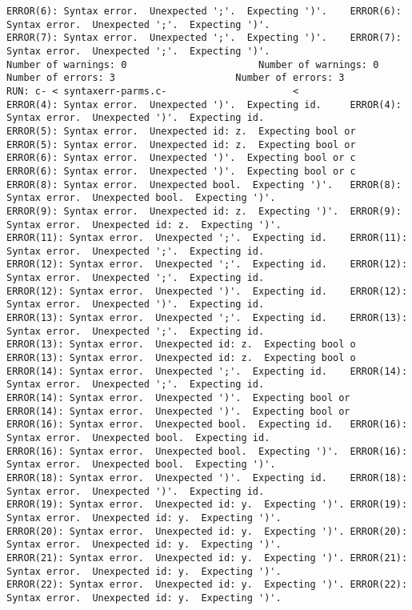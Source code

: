 \documentclass[12pt]{book}
\begin{document}
\begin{lstlisting}
ERROR(6): Syntax error.  Unexpected ';'.  Expecting ')'.	ERROR(6): Syntax error.  Unexpected ';'.  Expecting ')'.
ERROR(7): Syntax error.  Unexpected ';'.  Expecting ')'.	ERROR(7): Syntax error.  Unexpected ';'.  Expecting ')'.
Number of warnings: 0						Number of warnings: 0
Number of errors: 3						Number of errors: 3
RUN: c- < syntaxerr-parms.c-				      <
ERROR(4): Syntax error.  Unexpected ')'.  Expecting id.		ERROR(4): Syntax error.  Unexpected ')'.  Expecting id.
ERROR(5): Syntax error.  Unexpected id: z.  Expecting bool or	ERROR(5): Syntax error.  Unexpected id: z.  Expecting bool or
ERROR(6): Syntax error.  Unexpected ')'.  Expecting bool or c	ERROR(6): Syntax error.  Unexpected ')'.  Expecting bool or c
ERROR(8): Syntax error.  Unexpected bool.  Expecting ')'.	ERROR(8): Syntax error.  Unexpected bool.  Expecting ')'.
ERROR(9): Syntax error.  Unexpected id: z.  Expecting ')'.	ERROR(9): Syntax error.  Unexpected id: z.  Expecting ')'.
ERROR(11): Syntax error.  Unexpected ';'.  Expecting id.	ERROR(11): Syntax error.  Unexpected ';'.  Expecting id.
ERROR(12): Syntax error.  Unexpected ';'.  Expecting id.	ERROR(12): Syntax error.  Unexpected ';'.  Expecting id.
ERROR(12): Syntax error.  Unexpected ')'.  Expecting id.	ERROR(12): Syntax error.  Unexpected ')'.  Expecting id.
ERROR(13): Syntax error.  Unexpected ';'.  Expecting id.	ERROR(13): Syntax error.  Unexpected ';'.  Expecting id.
ERROR(13): Syntax error.  Unexpected id: z.  Expecting bool o	ERROR(13): Syntax error.  Unexpected id: z.  Expecting bool o
ERROR(14): Syntax error.  Unexpected ';'.  Expecting id.	ERROR(14): Syntax error.  Unexpected ';'.  Expecting id.
ERROR(14): Syntax error.  Unexpected ')'.  Expecting bool or 	ERROR(14): Syntax error.  Unexpected ')'.  Expecting bool or 
ERROR(16): Syntax error.  Unexpected bool.  Expecting id.	ERROR(16): Syntax error.  Unexpected bool.  Expecting id.
ERROR(16): Syntax error.  Unexpected bool.  Expecting ')'.	ERROR(16): Syntax error.  Unexpected bool.  Expecting ')'.
ERROR(18): Syntax error.  Unexpected ')'.  Expecting id.	ERROR(18): Syntax error.  Unexpected ')'.  Expecting id.
ERROR(19): Syntax error.  Unexpected id: y.  Expecting ')'.	ERROR(19): Syntax error.  Unexpected id: y.  Expecting ')'.
ERROR(20): Syntax error.  Unexpected id: y.  Expecting ')'.	ERROR(20): Syntax error.  Unexpected id: y.  Expecting ')'.
ERROR(21): Syntax error.  Unexpected id: y.  Expecting ')'.	ERROR(21): Syntax error.  Unexpected id: y.  Expecting ')'.
ERROR(22): Syntax error.  Unexpected id: y.  Expecting ')'.	ERROR(22): Syntax error.  Unexpected id: y.  Expecting ')'.

\end{lstlisting}
\end{document}
